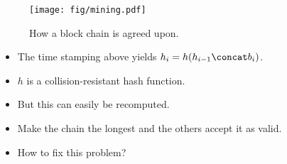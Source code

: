 %

\begin{frame}
  \begin{figure}
    \texttt{[image: fig/mining.pdf]}
    \caption{How a block chain is agreed upon.}
  \end{figure}
\end{frame}

\begin{frame}
  \begin{remark}[Forgery]
    \begin{itemize}
      \item The time stamping above yields \(h_i = h(h_{i-1}\concat b_i)\).
      \item \(h\) is a collision-resistant hash function.
      \item But this can easily be recomputed.
      \item Make the chain the longest and the others accept it as valid.
    \end{itemize}
  \end{remark}

  \begin{question}
    \begin{itemize}
      \item How to fix this problem?
    \end{itemize}
  \end{question}
\end{frame}

